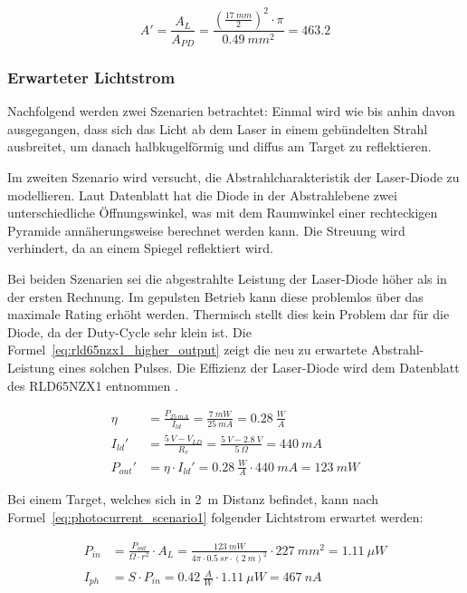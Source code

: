 \begin{equation}\label{eq:njl6401r3_lens}
    A' = \frac{A_{L}}{A_{PD}} = \frac{(\frac{17~mm}{2})^2 \cdot \pi}{0.49~mm^2} = 463.2
\end{equation}

\subsubsection{Erwarteter Lichtstrom}
Nachfolgend werden zwei Szenarien betrachtet: Einmal wird wie bis anhin davon ausgegangen, dass sich das Licht ab dem Laser
in einem gebündelten Strahl ausbreitet, um danach halbkugelförmig und diffus am Target zu reflektieren.

Im zweiten Szenario wird versucht, die Abstrahlcharakteristik der Laser-Diode zu modellieren. Laut Datenblatt hat die
Diode in der Abstrahlebene zwei unterschiedliche Öffnungswinkel, was mit dem Raumwinkel einer rechteckigen Pyramide
annäherungsweise berechnet werden kann. Die Streuung wird verhindert, da an einem Spiegel reflektiert wird.

Bei beiden Szenarien sei die abgestrahlte Leistung der Laser-Diode höher als in der ersten Rechnung. Im gepulsten
Betrieb kann diese problemlos über das maximale Rating erhöht werden. Thermisch stellt dies kein Problem dar für die Diode, da
der Duty-Cycle sehr klein ist. Die Formel~\ref{eq:rld65nzx1_higher_output} zeigt die neu zu erwartete Abstrahl-Leistung
eines solchen Pulses. Die Effizienz der Laser-Diode wird dem Datenblatt des RLD65NZX1 entnommen \cite{rohm2019rld65nzx1_datasheet}.

\begin{equation}\label{eq:rld65nzx1_higher_output}
    \begin{split}
        \eta     &= \frac{P_{25~mA}}{I_{ld}} = \frac{7~mW}{25~mA} = 0.28~\frac{W}{A}\\
        I_{ld}'  &= \frac{5~V - V_{LD}}{R_{v}} = \frac{5~V - 2.8~V}{5~\Omega} = 440~mA\\
        P_{out}' &= \eta \cdot I_{ld}' = 0.28~\frac{W}{A} \cdot 440~mA = 123~mW
    \end{split}
\end{equation}

Bei einem Target, welches sich in 2~m Distanz befindet, kann nach Formel~\ref{eq:photocurrent_scenario1} folgender
Lichtstrom erwartet werden:

\begin{equation}\label{eq:photocurrent_scenario1}
    \begin{split}
        P_{in} &= \frac{P_{out}}{\Omega \cdot r^2} \cdot A_{L} = \frac{123~mW}{4\pi \cdot 0.5~sr \cdot (2~m)^2} \cdot 227~mm^2 = 1.11~\mu W\\
        I_{ph} &= S \cdot P_{in} = 0.42~\frac{A}{W} \cdot 1.11~\mu W = 467~nA
    \end{split}
\end{equation}

